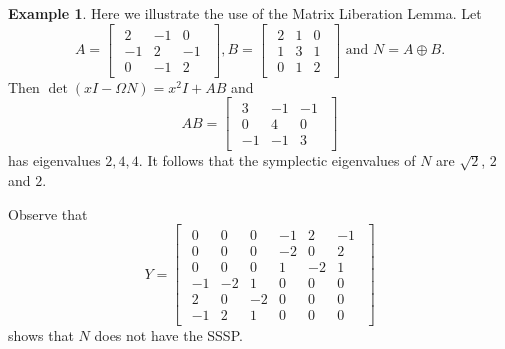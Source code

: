 \documentclass[12pt]{article}
\theoremstyle{definition}
\theoremstyle{definition}
\theoremstyle{definition}
\newtheorem{ex}[thm]{Example}
\numberwithin{figure}{section}
\numberwithin{equation}{section}
\begin{document}
\begin{ex}
Here we illustrate the use of the Matrix Liberation Lemma. 
Let 
\[ 
A=\begin{bmatrix}
\begin{array}{rrr}
2 & -1 & 0 \\
-1 & 2 & -1 \\
0 & -1 & 2
\end{array}
\end{bmatrix} ,  
 B= \begin{bmatrix} 
 \begin{array}{rrr}
2 & 1 & 0 \\
1 & 3 & 1 \\
0 & 1 & 2
\end{array}
\end{bmatrix}
\mbox{ and } 
N= A \oplus B. 
\] 
Then  $\det(xI-\Omega N)=x^2 I + AB$ and
\[
AB=
\begin{bmatrix}
 \begin{array}{rrr}
3 & -1 & -1 \\
0 & 4 & 0\\
-1 & -1 & 3
\end{array} 
\end{bmatrix}
\] 
 has eigenvalues  $2, 4,4$.
It follows that the symplectic eigenvalues of $N$  are  $\sqrt{2}$, $2$ and $2$.

{Observe that \[Y=
\begin{bmatrix}
\begin{array}{rrrrrr}0 & 0 & 0 & -1 & 2 & -1 \\
 0 & 0 & 0 & -2 & 0 & 2 \\
 0 & 0 & 0 & 1 & -2 & 1 \\
 -1 & -2 & 1 & 0 & 0 & 0 \\
 2 & 0 & -2 & 0 & 0 & 0 \\
 -1 & 2 & 1 & 0 & 0 & 0 \end{array} \end{bmatrix}\] shows that $N$ does not have the SSSP.}


\end{ex}
\end{document}
